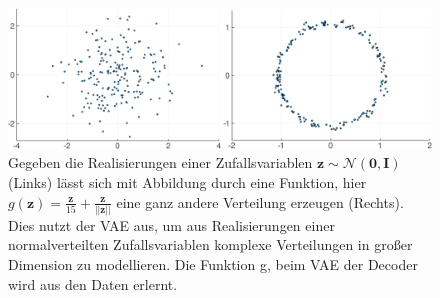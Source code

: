 \documentclass[12pt]{article}
\newcommand{\z}{\mathbf{z}}
\begin{document}
	\vspace*{0.1cm}
	\begin{figure}[h!]
		\centering
		\includegraphics[scale=0.4]{normalverteilt}
		\captionsetup{labelformat=empty}
		\caption{Gegeben die Realisierungen einer Zufallsvariablen $\z\sim \mathcal{N}(\mathbf{0},\mathbf{I})$  (Links) lässt sich mit Abbildung durch eine Funktion, hier $g(\textbf{z})= \frac{\textbf{z}}{15}+\frac{\textbf{z}}{||\textbf{z}||}$ eine ganz andere Verteilung erzeugen (Rechts). Dies nutzt der VAE aus, um aus Realisierungen einer normalverteilten Zufallsvariablen komplexe Verteilungen in großer Dimension zu modellieren. Die Funktion g, beim VAE der Decoder wird aus den Daten erlernt. \textbf{}\cite{tutvae}}
	\end{figure}
\end{document}
